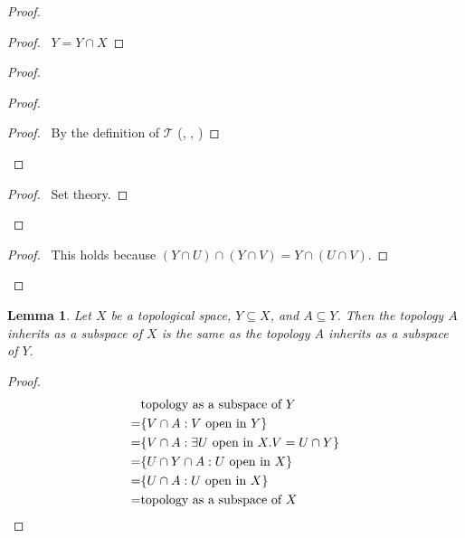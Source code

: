 \documentclass{report}
\let\qed\relax
\newtheorem{lm}{Lemma}[section]
\theoremstyle{definition}
\begin{document}
  \begin{proof}
    \pf
    \begin{proof}
      \pf\ $Y = Y \cap X$
    \end{proof}
    \begin{proof}
      \begin{proof}
        \begin{proof}
          \pf\ By the definition of $\mathcal{T}$ (,
          ,
          )
        \end{proof}
      \end{proof}
      \begin{proof}
        \pf\ Set theory.
      \end{proof}
    \end{proof}
    \begin{proof}
      \pf\ This holds because $(Y \cap U) \cap (Y \cap V) = Y \cap (U \cap V)$.
    \end{proof}
    \qed
  \end{proof}

  \begin{lm}
    Let $X$ be a topological space, $Y \subseteq X$, and $A \subseteq Y$. Then
    the
    topology $A$ inherits as a subspace of $X$ is the same as the topology $A$
    inherits as a subspace of $Y$.
  \end{lm}

  \begin{proof}
    \pf
    \begin{align*}
      & \text{topology as a subspace of } Y \\
      = & \{ V \cap A : V \text{ open in } Y \} \\
      = & \{ V \cap A : \exists U \text{ open in } X. V = U \cap Y \} \\
      = & \{ U \cap Y \cap A : U \text{ open in } X \} \\
      = & \{ U \cap A : U \text{ open in } X \} \\
      = & \text{topology as a subspace of } X \qed
    \end{align*}
  \end{proof}
\end{document}
